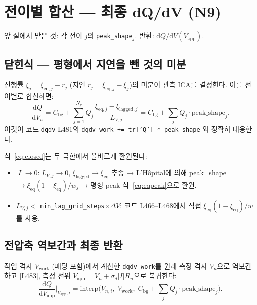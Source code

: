 \documentclass[11pt,a4paper]{article}
\newcommand{\dd}{\mathrm{d}}
\newcommand{\eq}{\mathrm{eq}}
\newcommand{\app}{\mathrm{app}}
\newcommand{\bg}{\mathrm{bg}}
\begin{document}
\section{전이별 합산 — 최종 dQ/dV (N9)}
\label{sec:total}
앞 절에서 받은 것: 각 전이 $j$의 \texttt{peak\_shape}$_j$.
반환: $\dd Q/\dd V(V_\app)$.

\subsection{닫힌식 — 평형에서 지연을 뺀 것의 미분}

진행률 $\xi_j = \xi_{\eq,j} - r_j$ (지연 $r_j = \xi_{\eq,j}-\xi_j$)의 미분이
관측 ICA를 결정한다. 이를 전이별로 합산하면:
\begin{equation}
  \boxed{\frac{\dd Q}{\dd V_n} = C_\bg + \sum_{j=1}^{N_p} Q_j\,
  \frac{\xi_{\eq,j}-\xi_{\mathrm{lagged},j}}{L_{V,j}} = C_\bg + \sum_j Q_j\cdot\text{peak\_shape}_j.}
  \label{eq:closed}
\end{equation}
이것이 코드 \texttt{dqdv} L481의 \texttt{dqdv\_work += tr['Q'] * peak\_shape}
와 정확히 대응한다.

식~\eqref{eq:closed}는 두 극한에서 올바르게 환원된다:
\begin{itemize}[leftmargin=1.8em,itemsep=2pt]
\item $|I|\to0$: $L_{V,j}\to0$, $\xi_{\mathrm{lagged}}\to\xi_{\eq}$ 추종 → L'H\^{o}pital에 의해
  peak\_shape $\to \xi_{\eq}(1-\xi_{\eq})/w_j$ → 평형 peak 식~\eqref{eq:eqpeak}으로 환원.
\item $L_{V,j} < $ \texttt{min\_lag\_grid\_steps}$\times\Delta V$:
  코드 L466--L468에서 직접 $\xi_{\eq}(1-\xi_{\eq})/w$를 사용.
\end{itemize}

\subsection{전압축 역보간과 최종 반환}

작업 격자 $V_\mathrm{work}$ (패딩 포함)에서 계산한 \texttt{dqdv\_work}를
원래 측정 격자 $V_n$으로 역보간하고 [L483],
측정 전위 $V_\app = V_n + \sigma_d|I|R_n$으로 복귀한다:
\begin{equation}
  \frac{\dd Q}{\dd V_\app}\bigg|_{V_\app,i}
  = \mathrm{interp}\!\Big(V_{n,i},\;V_\mathrm{work},\;
    C_\bg + \sum_j Q_j\cdot\text{peak\_shape}_j\Big).
  \label{eq:interp}
\end{equation}
\end{document}
